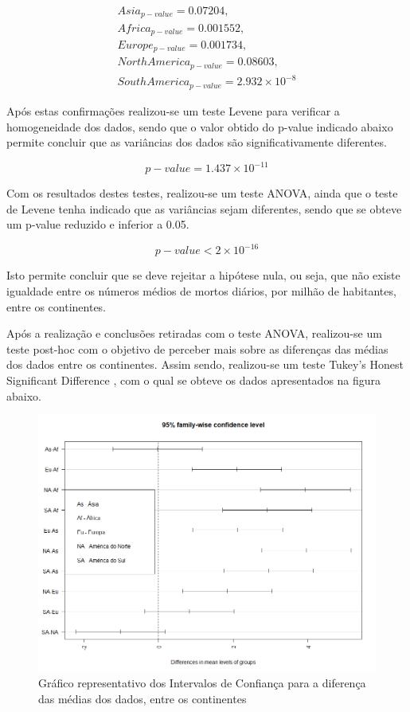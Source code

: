 \documentclass[conference]{IEEEtran}
\begin{document}
\begin{equation}
	\begin{array}{l}
	Asia_{p-value}=0.07204, \\
	Africa_{p-value}=0.001552, \\
	Europe_{p-value}=0.001734, \\
	North America_{p-value}=0.08603, \\
	South America_{p-value}=2.932\times 10^{-8}
	\end{array}
\end{equation}

Após estas confirmações realizou-se um teste Levene para verificar a homogeneidade dos dados, sendo que o valor obtido do p-value indicado abaixo permite concluir que as variâncias dos dados são significativamente diferentes.

\begin{equation}
p-value = 1.437\times 10^{-11}\label{eq}
\end{equation}

Com os resultados destes testes, realizou-se um teste ANOVA, ainda que o teste de Levene tenha indicado que as variâncias sejam diferentes, sendo que se obteve um p-value reduzido e inferior a 0.05.

\begin{equation}
p-value < 2\times 10^{-16}\label{eq}
\end{equation}

Isto permite concluir que se deve rejeitar a hipótese nula, ou seja, que não existe igualdade entre os números médios de mortos diários, por milhão de habitantes, entre os continentes.

Após a realização e conclusões retiradas com o teste ANOVA, realizou-se um teste post-hoc \cite{posthoc} com o objetivo de perceber mais sobre as diferenças das médias dos dados entre os continentes. Assim sendo, realizou-se um teste Tukey’s Honest Significant Difference \cite{tukey}, com o qual se obteve os dados apresentados na figura abaixo.

\begin{figure}[htbp]
\centerline{\includegraphics[width=0.95\columnwidth]{images/02.c.png}}
\caption{Gráfico representativo dos Intervalos de Confiança para a diferença das médias dos dados, entre os continentes}
\label{fig}
\end{figure}
\end{document}
